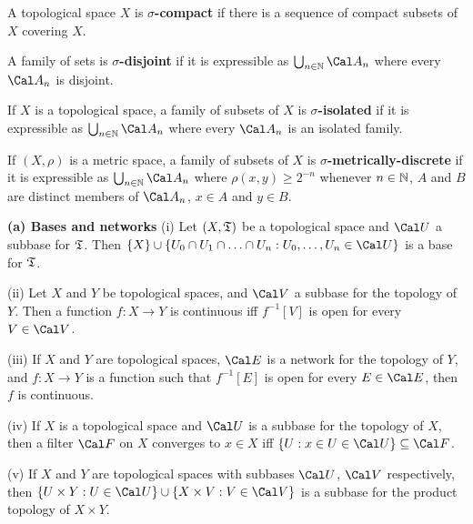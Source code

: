  A topological space $X$ is
{\bf $\sigma$-compact}
if there is a sequence of compact subsets of $X$ covering $X$.

 A family of sets is
{\bf $\sigma$-disjoint} if it is expressible as
$\bigcup_{n\in\Bbb N}\Cal A_n$ where every $\Cal A_n$ is disjoint.

 If $X$ is a topological space, a
family of subsets of $X$ is {\bf $\sigma$-isolated} if it is expressible
as $\bigcup_{n\in\Bbb N}\Cal A_n$ where every $\Cal A_n$ is an isolated
family.

 If $(X,\rho)$ is a metric space, a
family of subsets of $X$ is {\bf $\sigma$-metrically-discrete}
if it is expressible as $\bigcup_{n\in\Bbb N}\Cal A_n$ where
$\rho(x,y)\ge 2^{-n}$ whenever $n\in\Bbb N$, $A$ and $B$ are distinct
members of $\Cal A_n$, $x\in A$ and $y\in B$.

{\bf (a) Bases and networks} (i) Let $(X,\frak T)$ be a topological
space and $\Cal U$ a subbase for $\frak T$.   Then
$\{X\}\cup\{U_0\cap U_1\cap\ldots\cap U_n:U_0,\ldots,U_n\in\Cal U\}$ is
a base for $\frak T$.   

\quad (ii) Let $X$ and $Y$ be topological spaces, and $\Cal V$ a subbase
for the topology of $Y$.   Then a function $f:X\to Y$ is continuous iff
$f^{-1}[V]$ is open for every $V\in\Cal V$.   

\quad (iii) If $X$ and $Y$ are topological spaces, $\Cal E$ is a network
for the topology of $Y$, and $f:X\to Y$ is a function such that
$f^{-1}[E]$ is open for every $E\in\Cal E$, then $f$ is continuous.

\quad (iv) If $X$ is a topological space and $\Cal U$ is a subbase for
the topology of $X$, then a filter $\Cal F$ on $X$ converges to $x\in X$
iff $\{U:x\in U\in\Cal U\}\subseteq\Cal F$.   

\quad (v) If $X$ and $Y$ are topological spaces with subbases
$\Cal U$, $\Cal V$ respectively, then
$\{U\times Y:U\in\Cal U\}\cup\{X\times V:V\in\Cal V\}$ is a subbase for
the product topology of $X\times Y$.   

